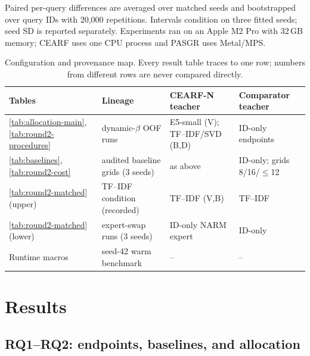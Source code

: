\documentclass[runningheads]{llncs}
\begin{document}
Paired per-query differences are averaged over matched seeds and bootstrapped
over query IDs with 20,000 repetitions. Intervals condition on three fitted
seeds; seed SD is reported separately. Experiments ran on an Apple M2 Pro with
32\,GB memory; CEARF uses one CPU process and PASGR uses Metal/MPS.

\begin{table}[t]
\caption{Configuration and provenance map. Every result table traces to one
row; numbers from different rows are never compared directly.}
\label{tab:config-map}
\centering\scriptsize
\setlength{\tabcolsep}{3.2pt}
\begin{tabular}{llll}
\toprule
Tables & Lineage & CEARF-N teacher & Comparator teacher\\
\midrule
\ref{tab:allocation-main}, \ref{tab:round2-procedures} & dynamic-$\beta$ OOF
runs & E5-small (V); TF--IDF/SVD (B,D) & ID-only endpoints\\
\ref{tab:baselines}, \ref{tab:round2-cost} & audited baseline grids (3 seeds)
& as above & ID-only; grids 8/16/$\leq$12\\
\ref{tab:round2-matched} (upper) & TF--IDF condition (recorded) &
TF--IDF (V,B) & TF--IDF\\
\ref{tab:round2-matched} (lower) & expert-swap runs (3 seeds) & ID-only NARM
expert & ID-only\\
Runtime macros & seed-42 warm benchmark & -- & --\\
\bottomrule
\end{tabular}
\end{table}

\section{Results}
\subsection{RQ1--RQ2: endpoints, baselines, and allocation}

\end{document}
